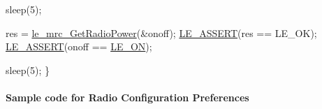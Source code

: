 \begin{DoxyCodeInclude}
    sleep(5);

    res = \hyperlink{le__mrc__interface_8h_aac51332c6c84e460746eb1ad45c064d6}{le\_mrc\_GetRadioPower}(&onoff);
    \hyperlink{le__log_8h_ac0dbbef91dc0fed449d0092ff0557b39}{LE\_ASSERT}(res == LE\_OK);
    \hyperlink{le__log_8h_ac0dbbef91dc0fed449d0092ff0557b39}{LE\_ASSERT}(onoff == \hyperlink{le__basics_8h_ae2138c90c41d30e2d510be01d8b374daa73623e8b9450d62517b467b9be2afce8}{LE\_ON});

    sleep(5);
\}
\end{DoxyCodeInclude}
\hypertarget{c_mrcRadioConfigurationPreferences}{}\paragraph{Sample code for Radio Configuration Preferences}\label{c_mrcRadioConfigurationPreferences}


